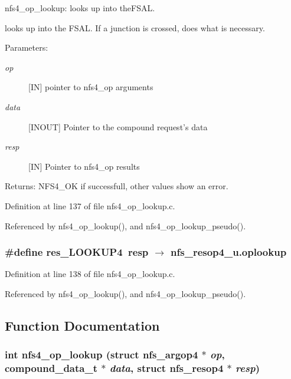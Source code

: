 nfs4\_\-op\_\-lookup: looks up into the\-FSAL.

looks up into the FSAL. If a junction is crossed, does what is necessary.

\begin{Desc}
\item[Parameters:]
\begin{description}
\item[{\em op}][IN] pointer to nfs4\_\-op arguments \item[{\em data}][INOUT] Pointer to the compound request's data \item[{\em resp}][IN] Pointer to nfs4\_\-op results\end{description}
\end{Desc}
\begin{Desc}
\item[Returns:]NFS4\_\-OK if successfull, other values show an error. \end{Desc}


Definition at line 137 of file nfs4\_\-op\_\-lookup.c.

Referenced by nfs4\_\-op\_\-lookup(), and nfs4\_\-op\_\-lookup\_\-pseudo().
\subsubsection{\setlength{\rightskip}{0pt plus 5cm}\#define res\_\-LOOKUP4\ resp $\rightarrow$ nfs\_\-resop4\_\-u.oplookup}\label{nfs4__op__lookup_8c_a1}




Definition at line 138 of file nfs4\_\-op\_\-lookup.c.

Referenced by nfs4\_\-op\_\-lookup(), and nfs4\_\-op\_\-lookup\_\-pseudo().

\subsection{Function Documentation}
\subsubsection{\setlength{\rightskip}{0pt plus 5cm}int nfs4\_\-op\_\-lookup (struct nfs\_\-argop4 $\ast$ {\em op}, compound\_\-data\_\-t $\ast$ {\em data}, struct nfs\_\-resop4 $\ast$ {\em resp})}\label{nfs4__op__lookup_8c_a2}




